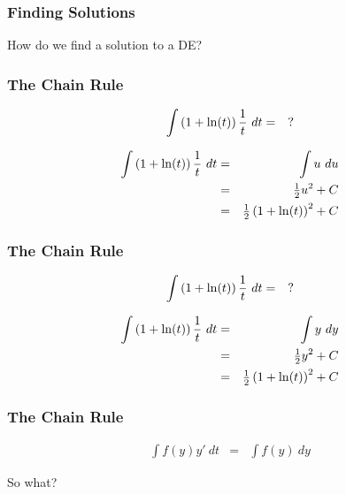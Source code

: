 \begin{frame}
  \frametitle{Finding Solutions}

  How do we find a solution to a DE?



\end{frame}


\begin{frame}
  \frametitle{The Chain Rule}

  \begin{eqnarray*}
    \int \left( 1 + \ln(t) \right) \frac{1}{t} ~ dt & = & ?
  \end{eqnarray*}


   {
    \begin{eqnarray*}
      \int \left( 1 + \ln(t) \right) \frac{1}{t} ~ dt & = & \int u ~ du \\
      & = & \mbox{$\frac{1}{2}$} u^2 + C \\
      & = & \mbox{$\frac{1}{2}$} \left( 1+\ln(t) \right)^2 + C
    \end{eqnarray*}
  }


\end{frame}

\begin{frame}
  \frametitle{The Chain Rule}

  \begin{eqnarray*}
    \int \left( 1 + \ln(t) \right) \frac{1}{t} ~ dt & = & ?
  \end{eqnarray*}


   {
    \begin{eqnarray*}
      \int \left( 1 + \ln(t) \right) \frac{1}{t} ~ dt & = & \int y ~ dy \\
      & = & \mbox{$\frac{1}{2}$} y^2 + C \\
      & = & \mbox{$\frac{1}{2}$} \left( 1+\ln(t) \right)^2 + C
    \end{eqnarray*}
  }


\end{frame}

\begin{frame}
  \frametitle{The Chain Rule}
  \begin{eqnarray*}
    \int f(y) y' ~ dt & = & \int f(y) ~ dy
  \end{eqnarray*}

  So what?

\end{frame}


